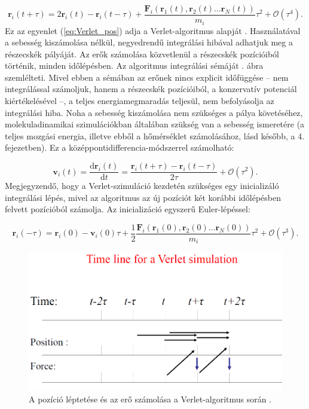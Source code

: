 \documentclass[12pt]{article}
\theoremstyle{plain}
\newcommand{\dd}{\textrm{d}}
\begin{document}
\begin{equation}
	\mathbf{r}_i (t+\tau) = 2 \mathbf{r}_i(t) - \mathbf{r}_i (t-\tau) + \frac{\mathbf{F}_i(\mathbf{r}_1 (t), \mathbf{r}_2 (t) \dots \mathbf{r}_N (t))}{m_i} \tau^2 + \mathcal{O}(\tau^4).
	\label{eq:Verlet_pos}
\end{equation}
Ez az egyenlet (\ref{eq:Verlet_pos}) adja a Verlet-algoritmus alapját \cite{lecture, Landau2012}. Használatával a sebesség kiszámolása nélkül, negyedrendű integrálási hibával adhatjuk meg a részecskék pályáját. Az erők számolása közvetlenül a részecskék pozícióiból történik, minden időlépésben. Az algoritmus integrálási sémáját . ábra szemlélteti. Mivel ebben a sémában az erőnek nincs explicit időfüggése -- nem integrálással számoljuk, hanem a részecskék pozícióiból, a konzervatív potenciál kiértékelésével --, a teljes energiamegmaradás teljesül, nem befolyásolja az integrálási hiba. Noha a sebesség kiszámolása nem szükséges a pálya követéséhez, molekuladinamikai szimulációkban általában szükség van a sebesség ismeretére (a teljes mozgási energia, illetve ebből a hőmérséklet számolásához, lásd később, a 4. fejezetben). Ez a középpontidifferencia-módszerrel számolható:

\begin{equation}
	\mathbf{v}_i(t) = \frac{\dd \mathbf{r}_i(t)}{\dd t} = \frac{\mathbf{r}_i(t+\tau) - \mathbf{r}_i(t-\tau)}{2 \tau} + \mathcal{O}(\tau^2).
	\label{eq:Verlet_vel}
\end{equation}
Megjegyzendő, hogy a Verlet-szimuláció kezdetén szükséges egy inicializáló integrálási lépés, mivel az algoritmus az új pozíciót két korábbi időlépésben felvett pozícióból számolja. Az inicializáció egyszerű Euler-lépéssel:

\begin{equation}
	\mathbf{r}_i(-\tau) = \mathbf{r}_i(0) - \mathbf{v}_i(0) \tau + \frac{1}{2} \frac{ \mathbf{F}_i(\mathbf{r}_1 (0), \mathbf{r}_2 (0) \dots \mathbf{r}_N (0))}{m_i} \tau^2 + \mathcal{O}(\tau^3).
	\label{eq:Verlet_init}
\end{equation}


\begin{figure}
	\centering
	\includegraphics[width=0.5\linewidth]{media/Verlet_timeline}
	\caption{A pozíció léptetése és az erő számolása a Verlet-algoritmus során \cite{lecture}.}
	\label{fig:verlettimeline}
\end{figure}
\end{document}

